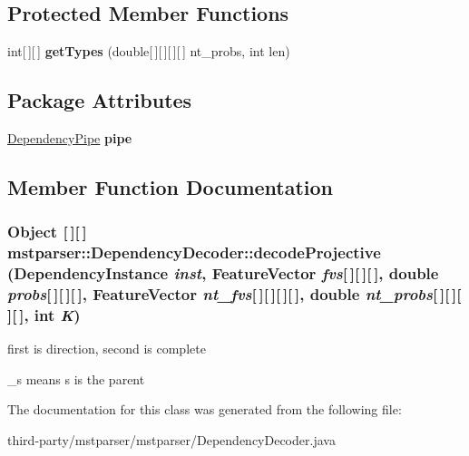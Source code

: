 \subsection*{Protected Member Functions}
\begin{DoxyCompactItemize}
\item 
\hypertarget{classmstparser_1_1DependencyDecoder_acfb28e05937c11be3c629c53589f0025}{
int\mbox{[}$\,$\mbox{]}\mbox{[}$\,$\mbox{]} {\bfseries getTypes} (double\mbox{[}$\,$\mbox{]}\mbox{[}$\,$\mbox{]}\mbox{[}$\,$\mbox{]}\mbox{[}$\,$\mbox{]} nt\_\-probs, int len)}
\label{classmstparser_1_1DependencyDecoder_acfb28e05937c11be3c629c53589f0025}

\end{DoxyCompactItemize}
\subsection*{Package Attributes}
\begin{DoxyCompactItemize}
\item 
\hypertarget{classmstparser_1_1DependencyDecoder_acd26a1532b9a0689ac751ddcb0dc8167}{
\hyperlink{classmstparser_1_1DependencyPipe}{DependencyPipe} {\bfseries pipe}}
\label{classmstparser_1_1DependencyDecoder_acd26a1532b9a0689ac751ddcb0dc8167}

\end{DoxyCompactItemize}


\subsection{Member Function Documentation}
\hypertarget{classmstparser_1_1DependencyDecoder_a59cae69b2c0146f3212968ba5b65c4b2}{
\subsubsection[{decodeProjective}]{\setlength{\rightskip}{0pt plus 5cm}Object \mbox{[}$\,$\mbox{]}\mbox{[}$\,$\mbox{]} mstparser::DependencyDecoder::decodeProjective ({\bf DependencyInstance} {\em inst}, \/  {\bf FeatureVector} {\em fvs}\mbox{[}$\,$\mbox{]}\mbox{[}$\,$\mbox{]}\mbox{[}$\,$\mbox{]}, \/  double {\em probs}\mbox{[}$\,$\mbox{]}\mbox{[}$\,$\mbox{]}\mbox{[}$\,$\mbox{]}, \/  {\bf FeatureVector} {\em nt\_\-fvs}\mbox{[}$\,$\mbox{]}\mbox{[}$\,$\mbox{]}\mbox{[}$\,$\mbox{]}\mbox{[}$\,$\mbox{]}, \/  double {\em nt\_\-probs}\mbox{[}$\,$\mbox{]}\mbox{[}$\,$\mbox{]}\mbox{[}$\,$\mbox{]}\mbox{[}$\,$\mbox{]}, \/  int {\em K})}}
\label{classmstparser_1_1DependencyDecoder_a59cae69b2c0146f3212968ba5b65c4b2}


first is direction, second is complete

\_\-s means s is the parent 



The documentation for this class was generated from the following file:\begin{DoxyCompactItemize}
\item 
third-\/party/mstparser/mstparser/DependencyDecoder.java\end{DoxyCompactItemize}
